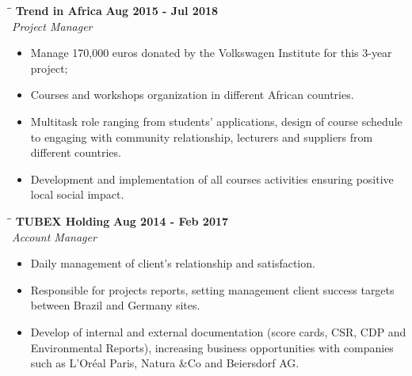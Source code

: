 \documentclass[margin]{res}
\begin{document}
\begin{resume}
\vspace{-0.1in}
    \begin{tabbing}
        \hspace{2.3in}\= \hspace{1.7in}\= \kill
        \textbf{Trend in Africa} \>\>\textbf{Aug 2015 - Jul 2018}\\
        \textit{Project Manager}\\        
    \end{tabbing}\vspace{-20pt}
    \vspace{2mm}
    \begin{itemize}
        \item Manage 170,000 euros donated by the Volkswagen Institute for this 3-year project;
        \item Courses and workshops organization in different African countries.
        \item Multitask role ranging from students’ applications, design of course schedule to engaging with community relationship, lecturers and suppliers from different countries.
        \item Development and implementation of all courses activities ensuring positive local social impact.
    \end{itemize}

\vspace{-0.1in}
    \begin{tabbing}
        \hspace{2.3in}\= \hspace{1.7in}\= \kill
        \textbf{TUBEX Holding} \>\>\textbf{Aug 2014 - Feb 2017}\\
        \textit{Account Manager}\\        
    \end{tabbing}\vspace{-20pt}
    \vspace{2mm}
    \begin{itemize}
        \item Daily management of client’s relationship and satisfaction.
        \item Responsible for projects reports, setting management client success targets between Brazil and Germany sites.
        \item Develop of internal and external documentation (score cards, CSR, CDP and Environmental Reports), increasing business opportunities with companies such as L’Oréal Paris, Natura \&Co and Beiersdorf AG.
    \end{itemize}    


\end{resume}
\end{document}
